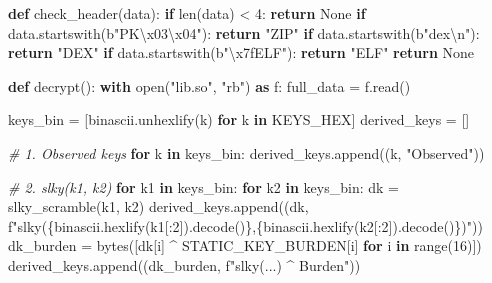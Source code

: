 \documentclass[
]{article}
\newenvironment{Shaded}{}{}
\newcommand{\BuiltInTok}[1]{\textcolor[rgb]{0.00,0.50,0.00}{#1}}
\newcommand{\CharTok}[1]{\textcolor[rgb]{0.25,0.44,0.63}{#1}}
\newcommand{\CommentTok}[1]{\textcolor[rgb]{0.38,0.63,0.69}{\textit{#1}}}
\newcommand{\ControlFlowTok}[1]{\textcolor[rgb]{0.00,0.44,0.13}{\textbf{#1}}}
\newcommand{\DecValTok}[1]{\textcolor[rgb]{0.25,0.63,0.44}{#1}}
\newcommand{\ImportTok}[1]{\textcolor[rgb]{0.00,0.50,0.00}{\textbf{#1}}}
\newcommand{\KeywordTok}[1]{\textcolor[rgb]{0.00,0.44,0.13}{\textbf{#1}}}
\newcommand{\NormalTok}[1]{#1}
\newcommand{\OperatorTok}[1]{\textcolor[rgb]{0.40,0.40,0.40}{#1}}
\newcommand{\SpecialCharTok}[1]{\textcolor[rgb]{0.25,0.44,0.63}{#1}}
\newcommand{\SpecialStringTok}[1]{\textcolor[rgb]{0.73,0.40,0.53}{#1}}
\newcommand{\StringTok}[1]{\textcolor[rgb]{0.25,0.44,0.63}{#1}}
\newcommand{\VariableTok}[1]{\textcolor[rgb]{0.10,0.09,0.49}{#1}}
\begin{document}
\begin{Shaded}
\begin{Highlighting}[]
\KeywordTok{def}\NormalTok{ check\_header(data):}
    \ControlFlowTok{if} \BuiltInTok{len}\NormalTok{(data) }\OperatorTok{\textless{}} \DecValTok{4}\NormalTok{: }\ControlFlowTok{return} \VariableTok{None}
    \ControlFlowTok{if}\NormalTok{ data.startswith(}\StringTok{b"PK}\CharTok{\textbackslash{}x03\textbackslash{}x04}\StringTok{"}\NormalTok{): }\ControlFlowTok{return} \StringTok{"ZIP"}
    \ControlFlowTok{if}\NormalTok{ data.startswith(}\StringTok{b"dex}\CharTok{\textbackslash{}n}\StringTok{"}\NormalTok{): }\ControlFlowTok{return} \StringTok{"DEX"}
    \ControlFlowTok{if}\NormalTok{ data.startswith(}\StringTok{b"}\CharTok{\textbackslash{}x7f}\StringTok{ELF"}\NormalTok{): }\ControlFlowTok{return} \StringTok{"ELF"}
    \ControlFlowTok{return} \VariableTok{None}

\KeywordTok{def}\NormalTok{ decrypt():}
    \ControlFlowTok{with} \BuiltInTok{open}\NormalTok{(}\StringTok{"lib.so"}\NormalTok{, }\StringTok{"rb"}\NormalTok{) }\ImportTok{as}\NormalTok{ f:}
\NormalTok{        full\_data }\OperatorTok{=}\NormalTok{ f.read()}
    
\NormalTok{    keys\_bin }\OperatorTok{=}\NormalTok{ [binascii.unhexlify(k) }\ControlFlowTok{for}\NormalTok{ k }\KeywordTok{in}\NormalTok{ KEYS\_HEX]}
\NormalTok{    derived\_keys }\OperatorTok{=}\NormalTok{ []}
    
    \CommentTok{\# 1. Observed keys}
    \ControlFlowTok{for}\NormalTok{ k }\KeywordTok{in}\NormalTok{ keys\_bin: derived\_keys.append((k, }\StringTok{"Observed"}\NormalTok{))}
    
    \CommentTok{\# 2. slky(k1, k2)}
    \ControlFlowTok{for}\NormalTok{ k1 }\KeywordTok{in}\NormalTok{ keys\_bin:}
        \ControlFlowTok{for}\NormalTok{ k2 }\KeywordTok{in}\NormalTok{ keys\_bin:}
\NormalTok{            dk }\OperatorTok{=}\NormalTok{ slky\_scramble(k1, k2)}
\NormalTok{            derived\_keys.append((dk, }\SpecialStringTok{f"slky(}\SpecialCharTok{\{}\NormalTok{binascii}\SpecialCharTok{.}\NormalTok{hexlify(k1[:}\DecValTok{2}\NormalTok{])}\SpecialCharTok{.}\NormalTok{decode()}\SpecialCharTok{\}}\SpecialStringTok{,}\SpecialCharTok{\{}\NormalTok{binascii}\SpecialCharTok{.}\NormalTok{hexlify(k2[:}\DecValTok{2}\NormalTok{])}\SpecialCharTok{.}\NormalTok{decode()}\SpecialCharTok{\}}\SpecialStringTok{)"}\NormalTok{))}
\NormalTok{            dk\_burden }\OperatorTok{=} \BuiltInTok{bytes}\NormalTok{([dk[i] }\OperatorTok{\^{}}\NormalTok{ STATIC\_KEY\_BURDEN[i] }\ControlFlowTok{for}\NormalTok{ i }\KeywordTok{in} \BuiltInTok{range}\NormalTok{(}\DecValTok{16}\NormalTok{)])}
\NormalTok{            derived\_keys.append((dk\_burden, }\SpecialStringTok{f"slky(...) \^{} Burden"}\NormalTok{))}


\end{Highlighting}
\end{Shaded}
\end{document}

